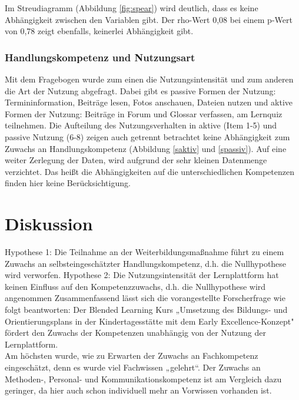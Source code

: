 \documentclass[12pt, bibliography=totoc]{scrartcl}
\begin{document}
Im Streudiagramm (Abbildung \ref{fig:spear}) wird deutlich, dass es
keine Abhängigkeit zwischen den Variablen gibt. Der rho-Wert 0,08 bei
einem p-Wert von 0,78 zeigt ebenfalls, keinerlei Abhängigkeit gibt.

\subsubsection{Handlungskompetenz und
Nutzungsart}\label{handlungskompetenz-und-nutzungsart}

Mit dem Fragebogen wurde zum einen die Nutzungsintensität und zum
anderen die Art der Nutzung abgefragt. Dabei gibt es passive Formen der
Nutzung: Termininformation, Beiträge lesen, Fotos anschauen, Dateien
nutzen und aktive Formen der Nutzung: Beiträge in Forum und Glossar
verfassen, am Lernquiz teilnehmen. Die Aufteilung des Nutzungsverhalten
in aktive (Item 1-5) und passive Nutzung (6-8) zeigen auch getrennt
betrachtet keine Abhängigkeit zum Zuwachs an Handlungskompetenz
(Abbildung \ref{saktiv} und \ref{spassiv}). Auf eine weiter Zerlegung
der Daten, wird aufgrund der sehr kleinen Datenmenge verzichtet. Das
heißt die Abhängigkeiten auf die unterschiedlichen Kompetenzen finden
hier keine Berücksichtigung.

\section{Diskussion}\label{diskussion}

Hypothese 1: Die Teilnahme an der Weiterbildungsmaßnahme führt zu einem
Zuwachs an selbsteingeschätzter Handlungskompetenz, d.h. die
Nullhypothese wird verworfen. Hypothese 2: Die Nutzungsintensität der
Lernplattform hat keinen Einfluss auf den Kompetenzzuwachs, d.h. die
Nullhypothese wird angenommen Zusammenfassend lässt sich die
vorangestellte Forscherfrage wie folgt beantworten: Der Blended Learning
Kurs „Umsetzung des Bildungs- und Orientierungsplans in der
Kindertagesstätte mit dem Early Excellence-Konzept"
 fördert den Zuwachs der Kompetenzen unabhängig
von der Nutzung der Lernplattform.\\
Am höchsten wurde, wie zu Erwarten der Zuwachs an Fachkompetenz
eingeschätzt, denn es wurde viel Fachwissen „gelehrt``. Der Zuwachs an
Methoden-, Personal- und Kommunikationskompetenz ist am Vergleich dazu
geringer, da hier auch schon individuell mehr an Vorwissen vorhanden
ist.
\end{document}
